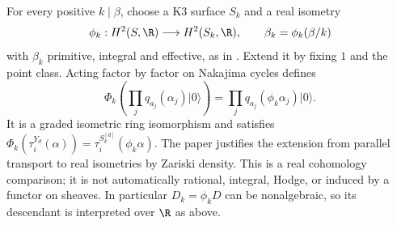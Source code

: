For every positive $k\mid\beta$, choose a K3 surface $S_k$ and a real
isometry
\[
 \phi_k:H^2(S,\R)\longrightarrow H^2(S_k,\R),\qquad
 \beta_k=\phi_k(\beta/k)
\]
with $\beta_k$ primitive, integral and effective, as in
\cite[\S5.3]{OberdieckMC}. Extend it by fixing $1$ and the point
class. Acting factor by factor on Nakajima cycles defines
\begin{equation}\label{rdt:eq:Phi}
 \Phi_k\left(\prod_jq_{a_j}(\alpha_j)|0\rangle\right)
   =\prod_jq_{a_j}(\phi_k\alpha_j)|0\rangle.
\end{equation}
It is a graded isometric ring isomorphism and satisfies
$\Phi_k(\tau_i^{Y_d}(\alpha))=\tau_i^{S_k^{[d]}}(\phi_k\alpha)$.
The paper justifies the extension from parallel transport to real
isometries by Zariski density. This is a real cohomology comparison;
it is not automatically rational, integral, Hodge, or induced by a
functor on sheaves. In particular $D_k=\phi_kD$ can be nonalgebraic,
so its descendant is interpreted over $\R$ as above.

